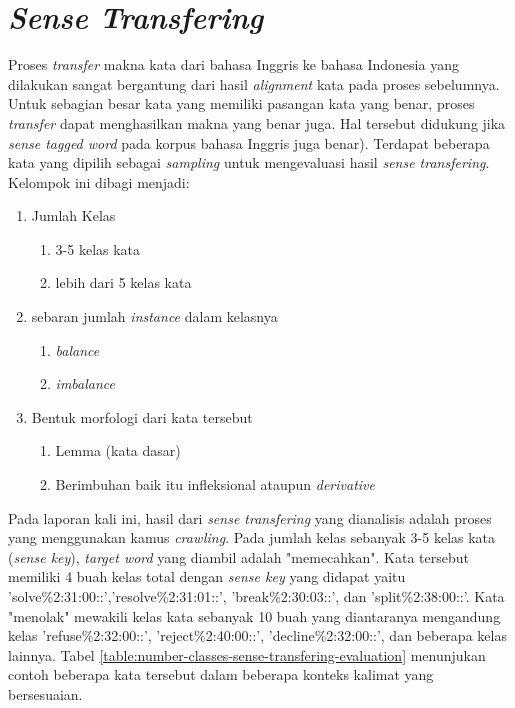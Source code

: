 \section{\textit{Sense Transfering}}

Proses \textit{transfer} makna kata dari bahasa Inggris ke bahasa Indonesia yang dilakukan sangat bergantung dari hasil \textit{alignment} kata pada proses sebelumnya. Untuk sebagian besar kata yang memiliki pasangan kata yang benar, proses \textit{transfer} dapat menghasilkan makna yang benar juga. Hal tersebut didukung jika \textit{sense tagged word} pada korpus bahasa Inggris juga benar). Terdapat beberapa kata yang dipilih sebagai \textit{sampling} untuk mengevaluasi hasil \textit{sense transfering}. Kelompok ini dibagi menjadi:

\begin{enumerate}
	\item Jumlah Kelas
	\begin{enumerate}
		\item 3-5 kelas kata
		\item lebih dari 5 kelas kata
	\end{enumerate}
	\item sebaran jumlah \textit{instance} dalam kelasnya
	\begin{enumerate}
		\item \textit{balance}
		\item \textit{imbalance}
	\end{enumerate}
	\item Bentuk morfologi dari kata tersebut
	\begin{enumerate}
		\item Lemma (kata dasar)
		\item Berimbuhan baik itu infleksional ataupun \textit{derivative}
	\end{enumerate}
\end{enumerate}

Pada laporan kali ini, hasil dari \textit{sense transfering} yang dianalisis adalah proses yang menggunakan kamus \textit{crawling}. Pada jumlah kelas sebanyak 3-5 kelas kata (\textit{sense key}), \textit{target word} yang diambil adalah "memecahkan". Kata tersebut memiliki 4 buah kelas total dengan \textit{sense key} yang didapat yaitu 'solve\%2:31:00::','resolve\%2:31:01::', 'break\%2:30:03::', dan 'split\%2:38:00::'. Kata "menolak" mewakili kelas kata sebanyak 10 buah yang diantaranya mengandung kelas 'refuse\%2:32:00::', 'reject\%2:40:00::', 'decline\%2:32:00::', dan beberapa kelas lainnya. Tabel \ref{table:number-classes-sense-transfering-evaluation} menunjukan contoh beberapa kata tersebut dalam beberapa konteks kalimat yang bersesuaian.

